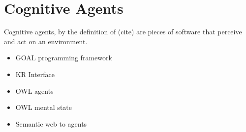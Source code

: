 \chapter{Cognitive Agents}

Cognitive agents, by the definition of (cite) are pieces of software that perceive and act on an environment. 
\begin{itemize}
\item GOAL programming framework
\item KR Interface
\item OWL agents
\item OWL mental state
\item Semantic web to agents
\end{itemize}
  
  